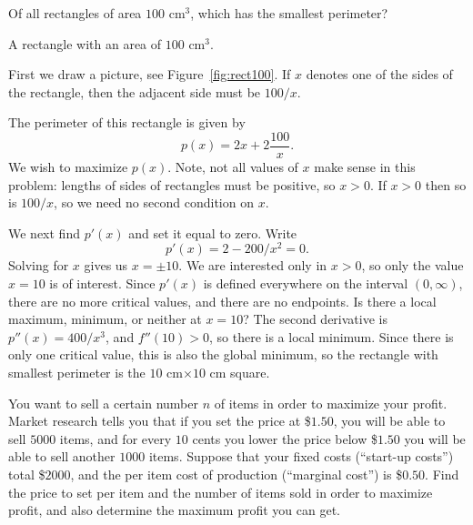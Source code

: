 \begin{example}
Of all rectangles of area $100$ cm$^3$, which has the smallest
perimeter?
\end{example}

\begin{marginfigure}
\caption{A rectangle with an area of $100$ cm$^3$.}
\label{fig:rect100}
\end{marginfigure}

\begin{solution}
First we draw a picture, see Figure~\ref{fig:rect100}.  If $x$
denotes one of the sides of the rectangle, then the adjacent side must
be $100/x$.


The perimeter of this rectangle is given by
\[
p(x)=2x+2\frac{100}{x}.
\]
We wish to maximize $p(x)$.  Note, not all values of $x$ make sense in this
problem: lengths of sides of rectangles must be positive, so $x>0$. If
$x>0$ then so is $100/x$, so we need no second condition on $x$.

We next find $p'(x)$ and set it equal to zero. Write
\[
p'(x)=2-200/x^2 = 0.
\]
Solving for $x$ gives us $x=\pm 10$. We are interested only in $x>0$,
so only the value $x=10$ is of interest. Since $p'(x)$ is defined
everywhere on the interval $(0,\infty)$, there are no more critical
values, and there are no endpoints. Is there a local maximum, minimum,
or neither at $x=10$? The second derivative is $p''(x)=400/x^3$, and
$f''(10)>0$, so there is a local minimum. Since there is only one
critical value, this is also the global minimum, so the rectangle with
smallest perimeter is the $10$ cm$\times10$ cm square.
\end{solution}

\begin{example}
You want to sell a certain number $n$ of items in order to maximize your
profit.  Market research tells you that if you set the price at \$$1.50$, you
will be able to sell $5000$ items, and for every $10$ cents you lower the price
below \$$1.50$ you will be able to sell another $1000$ items.  Suppose that
your fixed costs (``start-up costs'') total \$$2000$, and the per item cost
of production (``marginal cost'') is \$$0.50$.  Find the price to set per
item and the number of items sold in order to maximize profit, and also
determine the maximum profit you can get.
\end{example}

